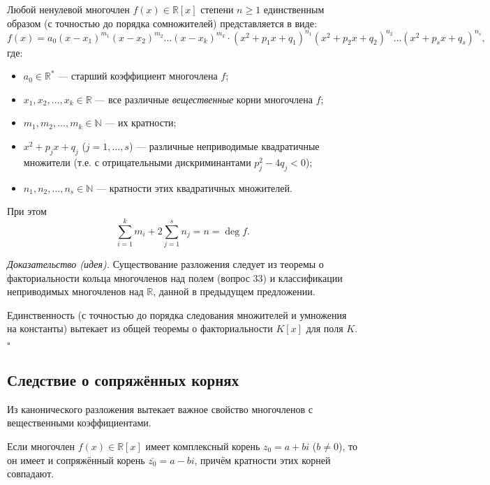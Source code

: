 \documentclass[a4paper,12pt]{article}
\theoremstyle{definition}
\theoremstyle{plain}
\theoremstyle{remark}
\begin{document}
	\begin{tcolorbox}[colback=green!5, colframe=green!50!black, title=Теорема (Каноническое разложение над \(\mathbb{R}\))]
		Любой ненулевой многочлен \(f(x) \in \mathbb{R}[x]\) степени \(n \geq 1\) единственным образом (с точностью до порядка сомножителей) представляется в виде:
		\[
		f(x) = a_0 (x - x_1)^{m_1} (x - x_2)^{m_2} \dots (x - x_k)^{m_k} \cdot (x^2 + p_1 x + q_1)^{n_1} (x^2 + p_2 x + q_2)^{n_2} \dots (x^2 + p_s x + q_s)^{n_s},
		\]
		где:
		\begin{itemize}
			\item \(a_0 \in \mathbb{R}^*\) — старший коэффициент многочлена \(f\);
			\item \(x_1, x_2, \dots, x_k \in \mathbb{R}\) — все различные \textit{вещественные} корни многочлена \(f\);
			\item \(m_1, m_2, \dots, m_k \in \mathbb{N}\) — их кратности;
			\item \(x^2 + p_j x + q_j\) (\(j = 1, \dots, s\)) — различные неприводимые квадратичные множители (т.е. с отрицательными дискриминантами \(p_j^2 - 4q_j < 0\));
			\item \(n_1, n_2, \dots, n_s \in \mathbb{N}\) — кратности этих квадратичных множителей.
		\end{itemize}
		При этом
		\[
		\sum_{i=1}^k m_i + 2\sum_{j=1}^s n_j = n = \deg f.
		\]
	\end{tcolorbox}
	
	\medskip
	\textit{Доказательство (идея).}
	Существование разложения следует из теоремы о факториальности кольца многочленов над полем (вопрос 33) и классификации неприводимых многочленов над \(\mathbb{R}\), данной в предыдущем предложении.
	
	Единственность (с точностью до порядка следования множителей и умножения на константы) вытекает из общей теоремы о факториальности \(K[x]\) для поля \(K\). \hfill \(\square\)
	
	\subsection{Следствие о сопряжённых корнях}
	
	Из канонического разложения вытекает важное свойство многочленов с вещественными коэффициентами.
	
	\begin{tcolorbox}[colback=yellow!5, colframe=orange!50!black, title=Следствие (Сопряжённые корни)]
		Если многочлен \(f(x) \in \mathbb{R}[x]\) имеет комплексный корень \(z_0 = a + bi\) (\(b \neq 0\)), то он имеет и сопряжённый корень \(\overline{z_0} = a - bi\), причём кратности этих корней совпадают.
	\end{tcolorbox}
	
\end{document}
